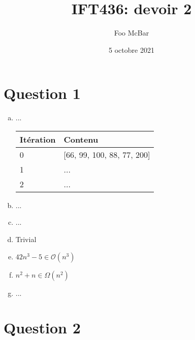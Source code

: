 \documentclass{article}
\title{IFT436: devoir 2}
\author{Foo McBar}
\date{5 octobre 2021}
\renewcommand{\O}{\mathcal{O}}
\begin{document}
\maketitle

\section*{Question 1}

\begin{enumerate}[(a)]

\item ...

  \begin{center}
    \begin{tabular}{ll}
      \toprule
      \textbf{Itération} & \textbf{Contenu} \\

      \midrule
      0 & [66, 99, 100, 88, 77, 200] \\

      \midrule
      1 & ... \\

      \midrule
      2 & ... \\

      \bottomrule
    \end{tabular}
  \end{center}

\item ...

\item ...

\item Trivial

\item $42n^3 - 5 \in \O(n^3)$

\item $n^2 + n \in \Omega(n^2)$

\item ...

\end{enumerate}

\section*{Question 2}
\end{document}
